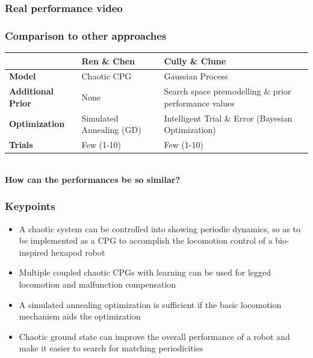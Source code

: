 \documentclass{beamer}
\begin{document}
\begin{frame}
\frametitle{Real performance video}
\begin{figure}
\center
{}
\end{figure}
\end{frame}

\begin{frame}
\frametitle{Comparison to other approaches}
    \hspace*{-0.7cm}
  \centering
  \begin{tabular}{p{2cm}p{4.2cm}p{4.2cm}}
     & \textbf{Ren \& Chen} & \textbf{Cully \& Clune} \\
     \hline
    \textbf{Model} & Chaotic CPG & Gaussian Process \\
    \hline
    \textbf{Additional Prior} & None & Search space \newline premodelling \& \newline  prior performance values\\
    \hline
    \textbf{Optimization} & Simulated Annealing (GD) & Intelligent Trial \& Error \newline (Bayesian Optimization) \\
    \hline
    \textbf{Trials} & Few (1-10) & Few (1-10)
  \end{tabular}
  \\[1cm]
  \textbf{How can the performances be so similar?}
\end{frame}

\begin{frame}
\frametitle{Keypoints}
\begin{itemize}
\item A chaotic system can be controlled into showing periodic dynamics, so as to be implemented as a CPG to accomplish the locomotion control of a bio-inspired hexapod robot
\item Multiple coupled chaotic CPGs with learning can be used for legged locomotion and malfunction compensation
\item A simulated annealing optimization is sufficient if the basic locomotion mechanism aids the optimization
\item Chaotic ground state can improve the overall performance of a robot and make it easier to search for matching periodicities
\end{itemize}

\end{frame}
\end{document}
